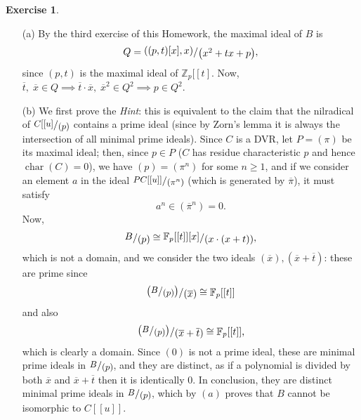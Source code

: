 \documentclass[a4paper]{article}
\newcommand{\Z}{\mathbb{Z}}
\newcommand{\ssfrac}[2]{
    \raisebox{+0.3ex}{$#1$}
    /
    \raisebox{-0.3ex}{$#2$}
}
\newcommand{\sfrac}[2]{
    \raisebox{+0.3ex}{\scalebox{0.9}{$#1$}}
    /
    \raisebox{-0.3ex}{\scalebox{0.9}{$#2$}}
}
\theoremstyle{definition}
\theoremstyle{definition}
\theoremstyle{remark}
\theoremstyle{definition}
\newtheorem{exercise}{Exercise}[section]
\begin{document}
\begin{exercise}\

	\begin{itemize}
		\item[(a)] By the third exercise of this Homework, the maximal ideal of $B$ is $$Q=\ssfrac{\left( (p,t)[x],x \right)}{\left( x^2+tx+p \right) }, $$ since $(p,t)$ is the maximal ideal
	of $\Z_p[[t]$. Now, $\overline{t},\;\overline{x}\in Q\implies \overline{t}\cdot\overline{x},\;\overline{x}^2\in Q^2\implies p\in Q^2$.
\item[(b)] We first prove the \textit{Hint}: this is equivalent to the claim that the nilradical of $\sfrac{C[[u]}{(p)}$ contains a prime ideal (since by Zorn's lemma it is always the
	intersection of all minimal prime ideals). Since $C$ is a DVR, let $P=(\pi)$ be its maximal ideal; then, since $p\in P$ ($C$ has residue characteristic $p$ and hence
	$\operatorname{char}(C)=0$), we have $(p)=(\pi^n)$ for some $n\geq 1$, and if we consider an element $a$ in the ideal
	$\sfrac{PC[[u]]}{(\pi^n)}$ (which is generated by $\overline{\pi}$), it must satisfy
	$$ a^n\in(\overline{\pi}^n)=0 .$$
	Now, $$\ssfrac{B}{(p)}\cong\ssfrac{\mathbb{F}_p[[t]][x]}{\left( x\cdot(x+t) \right) },$$ which is not a domain, and we consider the two ideals $(\overline{x}),
	(\overline{x}+\overline{t})$: these are prime since $$\ssfrac{\left(\sfrac{B}{(p)}\right)}{(\overline{x})}\cong\mathbb{F}_p[[t]]$$ and also
	$$\ssfrac{\left(\sfrac{B}{(p)}\right)}{(\overline{x}+\overline{t})}\cong\mathbb{F}_p[[t]],$$ which is clearly a domain.
	Since $(0)$ is not a prime ideal, these are minimal prime ideals in $\sfrac{B}{(p)}$, and they are distinct, as if a polynomial is divided by both $\overline{x}$
and $\overline{x}+\overline{t}$ then it is identically $0$.
In conclusion, they are distinct minimal prime ideals in $\sfrac{B}{(p)}$, which by $(a)$ proves that $B$ cannot be isomorphic to $C[[u]]$.
	\end{itemize}
\end{exercise}
\end{document}
